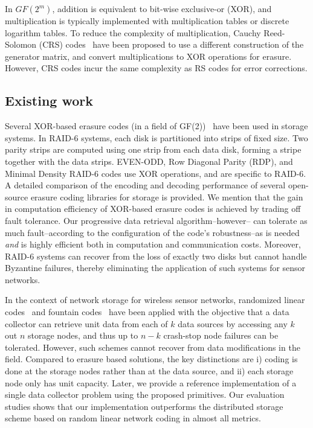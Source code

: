 \documentclass[10pt,journal,letterpaper,compsoc]{IEEEtran}
\newcommand{\0}{{\bf 0}}
\begin{document}
In $GF(2^m)$, addition is equivalent to bit-wise exclusive-or (XOR), and
multiplication is typically implemented with multiplication tables or discrete
logarithm tables.  To reduce the complexity of multiplication, Cauchy
Reed-Solomon (CRS) codes~\cite{Blomer95anxor-based} have been proposed to use a different
construction of the generator matrix, and convert multiplications to XOR
operations for erasure.  However, CRS codes incur the same complexity as RS codes for
error corrections. 
\subsection{Existing work}
Several XOR-based erasure codes (in a field of
GF(2))~\cite{corbett4rdp,blaum1999ldm,blaum:eca,lin2007dpl} have been used in
storage systems.  In RAID-6 systems, each disk is partitioned into strips of
fixed size. Two parity strips are computed using one strip from each data disk,
forming a stripe together with the data strips.  EVEN-ODD\cite{blaum:eca}, Row
Diagonal Parity (RDP)\cite{corbett4rdp}, and Minimal Density RAID-6
codes\cite{blaum1999ldm}  use XOR operations, and are specific to RAID-6.
A detailed comparison of the encoding and decoding
performance of several open-source erasure coding libraries for storage is provided\cite{Plank09}.
We mention that the gain in computation efficiency of XOR-based erasure codes is achieved by
trading off fault tolerance. 
Our progressive data retrieval algorithm--however--
can tolerate as much fault--according to the configuration of the code's robustness--as is needed 
\emph{and} is highly efficient both in computation and communication costs.
Moreover, RAID-6 systems can recover from the loss of
exactly two disks but cannot handle Byzantine failures, thereby eliminating the application of such
systems for sensor networks. 

In the context of network storage for wireless sensor networks,
randomized linear codes~\cite{DIM06} and fountain codes~\cite{lin2007dpl} have
been applied with the objective that a data collector can retrieve unit data
from each of $k$ data sources by accessing any $k$ out $n$ storage nodes,
and thus up to $n-k$ crash-stop node failures can be tolerated.  However, such schemes
cannot recover from data modifications in the field. Compared to erasure
based solutions, the key distinctions are i) coding is done at the storage
nodes rather than at the data source, and ii) each storage node only has unit
capacity. Later, we provide a reference implementation of a single data
collector problem using the proposed primitives. Our evaluation studies shows that
our implementation outperforms the distributed storage scheme based on random
linear network coding in almost all metrics. 
\end{document}

